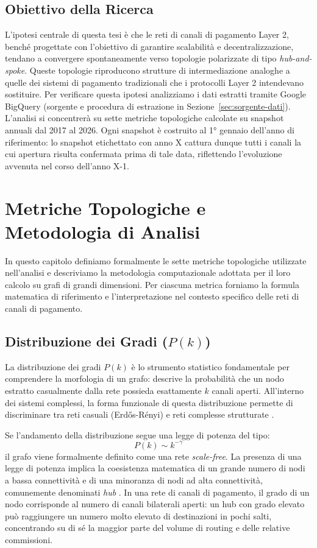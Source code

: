 \documentclass[12pt,a4paper,oneside]{book}
\begin{document}
\section{Obiettivo della Ricerca}

L'ipotesi centrale di questa tesi è che le reti di canali di pagamento Layer 2, benché progettate con l'obiettivo di garantire scalabilità e decentralizzazione, tendano a convergere spontaneamente verso topologie polarizzate di tipo \textit{hub-and-spoke}. Queste topologie riproducono strutture di intermediazione analoghe a quelle dei sistemi di pagamento tradizionali che i protocolli Layer 2 intendevano sostituire. Per verificare questa ipotesi analizziamo i dati estratti tramite Google BigQuery (sorgente e procedura di estrazione in Sezione~\ref{sec:sorgente-dati}). L'analisi si concentrerà su sette metriche topologiche calcolate su snapshot annuali dal 2017 al 2026. Ogni snapshot è costruito al 1° gennaio dell'anno di riferimento: lo snapshot etichettato con anno X cattura dunque tutti i canali la cui apertura risulta confermata prima di tale data, riflettendo l'evoluzione avvenuta nel corso dell'anno X-1.

\chapter{Metriche Topologiche e Metodologia di Analisi}
In questo capitolo definiamo formalmente le sette metriche topologiche utilizzate nell'analisi \cite{MagnaniMarzolla2026} e descriviamo la metodologia computazionale adottata per il loro calcolo su grafi di grandi dimensioni. Per ciascuna metrica forniamo la formula matematica di riferimento e l'interpretazione nel contesto specifico delle reti di canali di pagamento.

\section{Distribuzione dei Gradi ($P(k)$)}
La distribuzione dei gradi $P(k)$ è lo strumento statistico fondamentale per comprendere la morfologia di un grafo: descrive la probabilità che un nodo estratto casualmente dalla rete possieda esattamente $k$ canali aperti. All'interno dei sistemi complessi, la forma funzionale di questa distribuzione permette di discriminare tra reti casuali (Erdős-Rényi) e reti complesse strutturate \cite{BarabasiAlbert1999}.

Se l'andamento della distribuzione segue una legge di potenza del tipo:
\begin{equation}
    P(k) \sim k^{-\gamma}
\end{equation}
il grafo viene formalmente definito come una rete \textit{scale-free}. La presenza di una legge di potenza implica la coesistenza matematica di un grande numero di nodi a bassa connettività e di una minoranza di nodi ad alta connettività, comunemente denominati \textit{hub} \cite{BarabasiAlbert1999}. In una rete di canali di pagamento, il grado di un nodo corrisponde al numero di canali bilaterali aperti: un hub con grado elevato può raggiungere un numero molto elevato di destinazioni in pochi salti, concentrando su di sé la maggior parte del volume di routing e delle relative commissioni.
\end{document}
